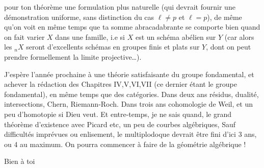 pour ton théorème une formulation plus naturelle (qui devrait  fournir une démonstration uniforme, sans distinction du cas $\ell\ne p$ et $\ell=p$), de même qu'on voit en même temps que ta somme abracadabrante se comporte bien quand on fait varier $X$ dans une famille, i.e si $X$ est  un schéma abélien sur $Y$ (car alors les ${}_nX$ seront d'excellents schémas en groupes finis et plats sur $Y$, dont on peut prendre formellement la limite projective\ldots).

J'espère  l'année prochaine à une théorie satisfaisante du groupe fondamental,  et achever la rédaction des Chapitres IV,V,VI,VII (ce dernier étant le groupe fondamental), en même temps que des catégories. Dans deux ans résidus, dualité, intersections, Chern, Riemann-Roch. Dans trois ans cohomologie de Weil, et un peu d'homotopie si Dieu veut. Et entre-temps, je ne sais quand, le grand théorème d'existence avec Picard etc, un peu de courbes algébriques,  Sauf difficultés imprévues ou enlisement, le multiplodoque devrait être fini d'ici 3 ans, ou 4 au maximum. On pourra commencer à faire de la géométrie algébrique !

Bien à toi
